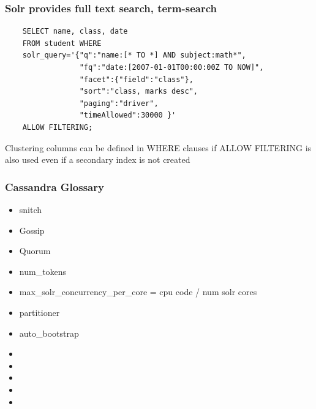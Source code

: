 \documentclass{beamer}
\begin{document}

\begin{frame}[fragile]
\frametitle{Solr provides full text search, term-search}
\begin{example}
	\begin{verbatim}	
	SELECT name, class, date
	FROM student WHERE 
	solr_query='{"q":"name:[* TO *] AND subject:math*",
	             "fq":"date:[2007-01-01T00:00:00Z TO NOW]",
	             "facet":{"field":"class"},
	             "sort":"class, marks desc", 
	             "paging":"driver", 
	             "timeAllowed":30000 }'
	ALLOW FILTERING;
	\end{verbatim}

\end{example}

Clustering columns can be defined in WHERE clauses if ALLOW FILTERING is also used even if a secondary index is not created

\end{frame}


\begin{frame}
\frametitle{Cassandra Glossary}
\begin{itemize}
	\item snitch
	\item Gossip
	\item Quorum
	\item num\_tokens
	\item max\_solr\_concurrency\_per\_core = cpu code / num solr cores
	\item partitioner
	\item auto\_bootstrap  
	\item 
	\item 
	\item 
	\item 
	\item 
\end{itemize}
\end{frame}





\end{document}
